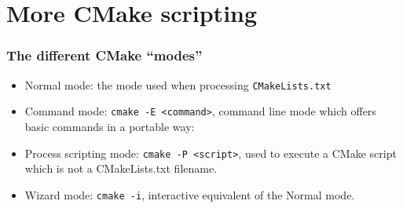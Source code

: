 \documentclass[compress,slidestop,table
              ]
               {beamer}
\newcommand{\fname}[1]{\texttt{#1}}
\begin{document}
\section{More CMake scripting}
\begin{frame}[fragile]
\frametitle{The different CMake ``modes''}
\begin{itemize}
\item Normal mode: the mode used when processing \fname{CMakeLists.txt}
\item Command mode: \fname{cmake -E <command>}, command line mode
      which offers basic commands in a portable way:

\item Process scripting mode: \fname{cmake -P <script>}, used to execute
      a CMake script which is not a CMakeLists.txt filename.

\item Wizard mode: \fname{cmake -i}, interactive equivalent of the Normal mode.
\end{itemize}
\end{frame}
\end{document}
